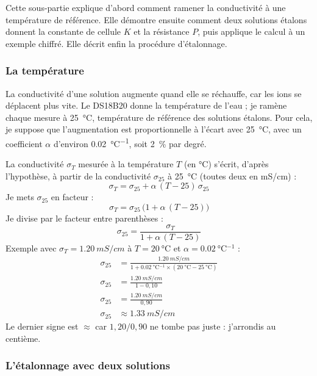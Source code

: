 Cette sous-partie explique d'abord comment ramener la conductivité à une température de référence. Elle démontre ensuite comment deux solutions étalons donnent la constante de cellule $K$ et la résistance $P$, puis applique le calcul à un exemple chiffré. Elle décrit enfin la procédure d'étalonnage.

\subsubsection*{La température}

La conductivité d'une solution augmente quand elle se réchauffe, car les ions se déplacent plus vite. Le DS18B20 donne la température de l'eau ; je ramène chaque mesure à \qty{25}{\celsius}, température de référence des solutions étalons. Pour cela, je suppose que l'augmentation est proportionnelle à l'écart avec \qty{25}{\celsius}, avec un coefficient $\alpha$ d'environ \qty{0,02}{\celsius^{-1}}, soit \qty{2}{\percent} par degré.

\begin{demonstration}
La conductivité $\sigma_T$ mesurée à la température $T$ (en \unit{\celsius}) s'écrit, d'après l'hypothèse, à partir de la conductivité $\sigma_{25}$ à \qty{25}{\celsius} (toutes deux en mS/cm) :
\[
\sigma_T = \sigma_{25} + \alpha\,(T - 25)\,\sigma_{25}
\]
Je mets $\sigma_{25}$ en facteur :
\[
\sigma_T = \sigma_{25}\,\bigl(1 + \alpha\,(T - 25)\bigr)
\]
Je divise par le facteur entre parenthèses :
\[
\sigma_{25} = \frac{\sigma_T}{1 + \alpha\,(T - 25)}
\]
Exemple avec $\sigma_T = \qty{1,20}{mS/cm}$ à $T = \qty{20}{\celsius}$ et $\alpha = \qty{0,02}{\celsius^{-1}}$ :
\begin{align*}
\sigma_{25} &= \frac{\qty{1,20}{mS/cm}}{1 + \qty{0,02}{\celsius^{-1}}\times(\qty{20}{\celsius} - \qty{25}{\celsius})}\\
\sigma_{25} &= \frac{\qty{1,20}{mS/cm}}{1 - 0{,}10}\\
\sigma_{25} &= \frac{\qty{1,20}{mS/cm}}{0{,}90}\\
\sigma_{25} &\approx \qty{1,33}{mS/cm}
\end{align*}
Le dernier signe est $\approx$ car $1{,}20/0{,}90$ ne tombe pas juste : j'arrondis au centième.
\end{demonstration}

\subsubsection*{L'étalonnage avec deux solutions}

